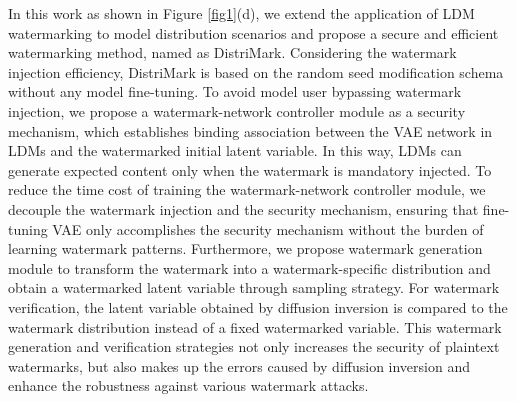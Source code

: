 In this work as shown in Figure \ref{fig1}(d), we extend the application of LDM watermarking to model distribution scenarios and propose a secure and efficient watermarking method, named as DistriMark. Considering the watermark injection efficiency, DistriMark is based on the random seed modification schema without any model fine-tuning. To avoid model user bypassing watermark injection, we propose a watermark-network controller module as a security mechanism, which establishes binding association between the VAE network in LDMs and the watermarked initial latent variable. In this way, LDMs can generate expected content only when the watermark is mandatory injected. To reduce the time cost of training the watermark-network controller module, we decouple the watermark injection and the security mechanism, ensuring that fine-tuning VAE only accomplishes the security mechanism without the burden of learning watermark patterns. Furthermore, we propose watermark generation module to transform the watermark into a watermark-specific distribution and obtain a watermarked latent variable through sampling strategy. For watermark verification, the  latent variable obtained by diffusion inversion is compared to the watermark distribution instead of a fixed watermarked variable. 
This watermark generation and verification strategies not only increases the security of plaintext watermarks, but also makes up the errors caused by diffusion inversion and enhance the robustness against various watermark attacks. 


